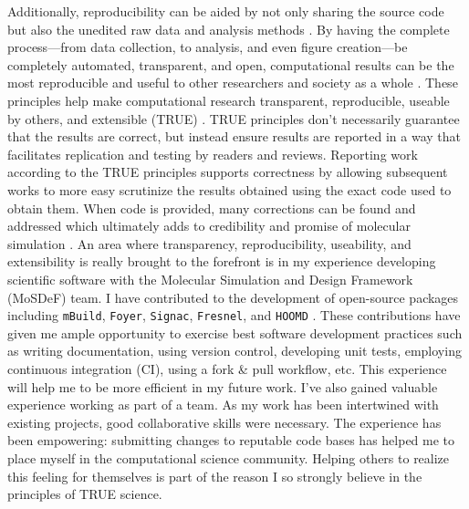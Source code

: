 Additionally, reproducibility can be aided by not only sharing the source code but also the unedited raw data and analysis methods \cite{Miyakawa2020}. 
By having the complete process---from data collection, to analysis, and even figure creation---be completely automated, transparent, and open, computational results can be the most reproducible and useful to other researchers and society as a whole \cite{Taylor2019, Donoho2009}.
These principles help make computational research transparent, reproducible, useable by others, and extensible (TRUE) \cite{Thompson2020}.
TRUE principles don't necessarily guarantee that the results are correct, but instead ensure results are reported in a way that facilitates replication and testing by readers and reviews.
Reporting work according to the TRUE principles supports correctness by allowing subsequent works to more easy scrutinize the results obtained using the exact code used to obtain them.
When code is provided, many corrections can be found and addressed which ultimately adds to credibility and promise of molecular simulation \cite{superwater}.
An area where transparency, reproducibility, useability, and extensibility is really brought to the forefront is in my experience developing scientific software with the Molecular Simulation and Design Framework (MoSDeF) team.
I have contributed to the development of open-source packages including \texttt{mBuild}, \texttt{Foyer}, \texttt{Signac}, \texttt{Fresnel}, and \texttt{HOOMD} \cite{mbuild, foyer, signac, fresnel, hoomd}.
These contributions have given me ample opportunity to exercise best software development practices such as writing documentation, using version control, developing unit tests, employing continuous integration (CI), using a fork \& pull workflow, etc.
This experience will help me to be more efficient in my future work.
I've also gained valuable experience working as part of a team.
As my work has been intertwined with existing projects, good collaborative skills were necessary.
The experience has been empowering: submitting changes to reputable code bases has helped me to place myself in the computational science community.
Helping others to realize this feeling for themselves is part of the reason I so strongly believe in the principles of TRUE science.

